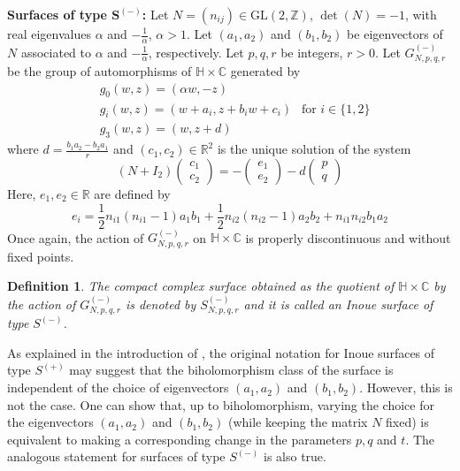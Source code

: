 \documentclass[12pt]{amsart}
\newtheorem{definition}{Definition}[section]
\newcommand{\R}{\mathbb{R}}
\newcommand{\Z}{\mathbb{Z}}
\newcommand{\C}{\mathbb{C}}
\newcommand{\HH}{\mathbb{H}}
\begin{document}
\noindent
{\bf Surfaces of type $\mathbf{S^{(-)}}$:} Let $N = (n_{ij})\in \text{GL}(2,\Z)$, $\det(N)=-1$, with real eigenvalues $\alpha$ and $-\frac{1}{\alpha}$, $\alpha > 1$. Let $(a_1,a_2)$ and $(b_1,b_2)$ be eigenvectors of $N$ associated to $\alpha$ and $-\frac{1}{\alpha}$, respectively. Let $p,q,r$ be integers, $r>0$. Let $G_{N,p,q,r}^{(-)}$ be the group of automorphisms of $\HH \times \C$ generated by 
\begin{equation}\label{Gm}
\begin{split}
&g_0(w,z) = (\alpha w,-z)\\
&g_i(w,z) = (w + a_i, z+ b_iw+c_i)\ \ \text{ for }i\in\{1,2\}\\
&g_3(w,z) = (w, z+ d)
\end{split}
\end{equation}
where $d=\frac{b_1a_2-b_2a_1}{r}$ and $(c_1,c_2) \in \R^2$ is the unique solution of the system
\begin{equation}\label{InCon1}
(N+I_2)\begin{pmatrix}
c_1\\
c_2
\end{pmatrix}=
-\begin{pmatrix}
e_1\\
e_2
\end{pmatrix}-d
\begin{pmatrix}
p\\
q
\end{pmatrix}
\end{equation}
Here, $e_1,e_2\in \R$ are defined by
$$
e_i = \frac{1}{2}n_{i1}(n_{i1}-1)a_1b_1 + \frac{1}{2}n_{i2}(n_{i2}-1)a_2b_2 + n_{i1}n_{i2}b_1a_2
$$
Once again, the action of $G^{(-)}_{N,p,q,r}$ on $\HH \times \C$ is properly discontinuous and without fixed points.

\begin{definition}
The compact complex surface obtained as the quotient of $\HH \times \C$ by the action of $G^{(-)}_{N,p,q,r}$ is denoted by $S^{(-)}_{N,p,q,r}$ and it is called an Inoue surface of type $S^{(-)}$.\par
\end{definition}

\noindent
As explained in the introduction of \cite{KT}, the original notation for Inoue surfaces of type $S^{(+)}$ may suggest that the biholomorphism class of the surface is independent of the choice of eigenvectors $(a_1,a_2)$ and $(b_1,b_2)$. However, this is not the case. One can show that, up to biholomorphism, varying the choice for the eigenvectors $(a_1,a_2)$ and $(b_1,b_2)$ (while keeping the matrix $N$ fixed) is equivalent to making a corresponding change in the parameters $p,q$ and $t$. The analogous statement for surfaces of type $S^{(-)}$ is also true.
\end{document}
